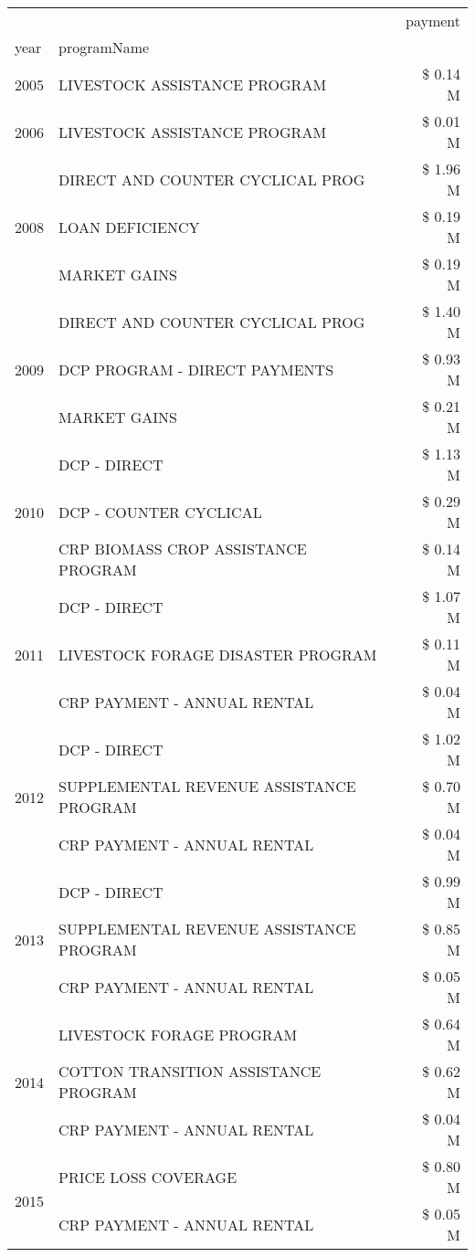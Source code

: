 \begin{tabular}{llr}
\toprule
 &  & payment \\
year & programName &  \\
\midrule
2005 & LIVESTOCK ASSISTANCE PROGRAM & \$ 0.14 M \\
\cline{1-3}
2006 & LIVESTOCK ASSISTANCE PROGRAM & \$ 0.01 M \\
\cline{1-3}
\multirow[t]{3}{*}{2008} & DIRECT AND COUNTER CYCLICAL PROG & \$ 1.96 M \\
 & LOAN DEFICIENCY & \$ 0.19 M \\
 & MARKET GAINS & \$ 0.19 M \\
\cline{1-3}
\multirow[t]{3}{*}{2009} & DIRECT AND COUNTER CYCLICAL PROG & \$ 1.40 M \\
 & DCP PROGRAM - DIRECT PAYMENTS & \$ 0.93 M \\
 & MARKET GAINS & \$ 0.21 M \\
\cline{1-3}
\multirow[t]{3}{*}{2010} & DCP - DIRECT & \$ 1.13 M \\
 & DCP - COUNTER CYCLICAL & \$ 0.29 M \\
 & CRP BIOMASS CROP ASSISTANCE PROGRAM & \$ 0.14 M \\
\cline{1-3}
\multirow[t]{3}{*}{2011} & DCP - DIRECT & \$ 1.07 M \\
 & LIVESTOCK FORAGE DISASTER PROGRAM & \$ 0.11 M \\
 & CRP PAYMENT - ANNUAL RENTAL & \$ 0.04 M \\
\cline{1-3}
\multirow[t]{3}{*}{2012} & DCP - DIRECT & \$ 1.02 M \\
 & SUPPLEMENTAL REVENUE ASSISTANCE PROGRAM & \$ 0.70 M \\
 & CRP PAYMENT - ANNUAL RENTAL & \$ 0.04 M \\
\cline{1-3}
\multirow[t]{3}{*}{2013} & DCP - DIRECT & \$ 0.99 M \\
 & SUPPLEMENTAL REVENUE ASSISTANCE PROGRAM & \$ 0.85 M \\
 & CRP PAYMENT - ANNUAL RENTAL & \$ 0.05 M \\
\cline{1-3}
\multirow[t]{3}{*}{2014} & LIVESTOCK FORAGE PROGRAM & \$ 0.64 M \\
 & COTTON TRANSITION ASSISTANCE PROGRAM & \$ 0.62 M \\
 & CRP PAYMENT - ANNUAL RENTAL & \$ 0.04 M \\
\cline{1-3}
\multirow[t]{3}{*}{2015} & PRICE LOSS COVERAGE & \$ 0.80 M \\
 & CRP PAYMENT - ANNUAL RENTAL & \$ 0.05 M \\

\end{tabular}
